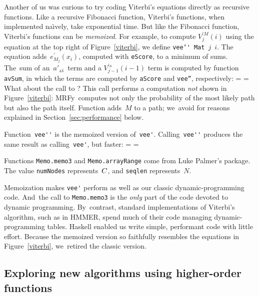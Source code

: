 \documentclass[preprint,nonatbib,blockstyle,times]{sigplanconf}
\newcommand\mrfy{MRFy} %
\newcommand\alignwidth{\ensuremath C} %
\newcommand\naive{na\"\i ve}
\newcommand\figref[1]{Figure~\ref{#1}}
\newcommand\secref[1]{Section~\ref{sec:#1}}
\newif\ifverbatimsmall
\newcommand\smallverbatiminput[1]{%
  \verbatimsmalltrue
  \presvtopsep=\topsep
  \topsep=0.78\topsep
  \verbatimsmallfalse
  \topsep=\presvtopsep
}
\newcommand\smallfuzzverbatiminput[2]{%
  \hfuzz=#1 \smallverbatiminput{#2}\hfuzz=0pt }
\begin{document}
Another of us was curious to try coding Viterbi's equations
directly as recursive functions.
Like a recursive Fibonacci function, Viterbi's functions,
when implemented \naive ly,
take exponential time.
But like the Fibonacci function, Viterbi's functions can be
\emph{memoized}.
For example, to compute $V_j^{\prime M}(i)$ using the equation at the top
right of \figref{viterbi}, we define
\mbox{\texttt{vee\char`\'} \texttt{Mat} $j$ $i$}.
The equation adds~$e^{\prime}_{M_{j}}(x_{i})$, computed
with \texttt{eScore}, to a minimum of sums.
The~sum of an~$a'_{s\hat s}$~term and a $V^{\prime s}_{j-1}(i-1)$ term 
is computed by function \texttt{avSum}, in which
the terms are computed by \texttt{aScore} and \texttt{vee''}, respectively:
\smallfuzzverbatiminput{2.9pt}{vfix}
What about the call to
?
This call performs a computation \emph{not} shown in \figref{viterbi}:
\mrfy\ computes not only the {probability} of the most likely path but 
also the path itself.
Function  adds~$M$ to a path;
we~avoid \mbox{} for reasons explained
in \secref{performance} below. 

Function~\verb+vee''+ is the {memoized} version of~\verb+vee'+.
Calling~\verb+vee''+ produces the same result as calling~\verb+vee'+,
but faster: 
\smallverbatiminput{memo}
Functions \texttt{Memo.memo3} and \texttt{Memo.arrayRange} come from
Luke Palmer's
 package.
The value
\texttt{numNodes} represents~$\alignwidth$,
and \texttt{seqlen} represents~$N$.

Memoization makes \verb+vee'+ perform as well as our classic
dynamic-programming code.
And~the call to \texttt{Memo.memo3} is the \emph{only} part of the code
devoted to dynamic programming.
By~contrast, standard implementations of Viterbi's algorithm, such as in HMMER,
spend much of their code 
managing dynamic-programming tables.
Haskell enabled us write simple, performant code with little effort.
%
Because the memoized version so faithfully resembles the equations in
\figref{viterbi}, we~retired the classic version.





\subsection{Exploring new algorithms using higher-order functions}
\end{document}
